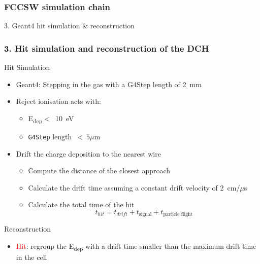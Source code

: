 \documentclass[aspectratio=169, hyperref={colorlinks=true,pdfpagelabels=false,linkcolor=black}, xcolor=dvipsnames,10pt]{beamer}
\begin{document}
\begin{frame}
	\frametitle{FCCSW simulation chain}
	
    \centering

	\vspace{1cm}
	\centering
	\Huge{3. Geant4 hit simulation \& reconstruction}
	
\end{frame}

\begin{frame}
	\frametitle{3. Hit simulation and reconstruction of the DCH}

	\begin{block}{Hit Simulation}
	\begin{itemize}
	\item Geant4: Stepping in the gas with a G4Step length of 2~mm 
	\item Reject ionisation acts with:
		\begin{itemize}
		\item E\textsubscript{dep}$<$~10~eV
		\item \texttt{G4Step} length~$<~5\mu$m
		\end{itemize} 
	
	\item Drift the charge deposition to the nearest wire 
		\begin{itemize}
		\item Compute the distance of the closest approach
		\item Calculate the drift time assuming a constant drift velocity of 2~cm/$\mu$s
		\item Calculate the total time of the hit \\
		\begin{equation}
	      t_{hit} = t_{drift}+t_{\text{signal}}+t_{\text{particle flight}}
    		\end{equation}
		\end{itemize} 
	\end{itemize}
	\end{block}
		
	\begin{block}{Reconstruction}
		\begin{itemize}
		\item \textcolor{Red}{Hit}: regroup the E\textsubscript{dep} with a drift time smaller than the maximum drift time in the cell
		\end{itemize}
	\end{block}

	
	
	
\end{frame}
\end{document}
